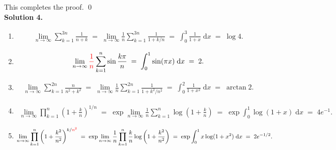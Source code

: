 \documentclass[10pt]{article}
\begin{document}
        This completes the proof. \qed\\

        \textbf{Solution 4.}
        \begin{enumerate}
                \item
                        \begin{align*}
                                \lim_{n \to \infty} \sum_{k = 1}^{3n} \frac{1}{n + k}
                                \;=\; \lim_{n \to \infty} \frac{1}{n}\sum_{k = 1}^{3n} \frac{1}{1 + k /n}
                                \;=\; \int_0^3 \frac{1}{1 + x} \;\mathrm{d}{x}
                                \;=\; \log{4}.
                        \end{align*}
                \item 
                        \begin{align*}
                                \lim_{n \to \infty} \textcolor{red}{\frac{1}{n}}\sum_{k = 1}^{n} \sin{\frac{k\pi}{n}}
                                \;=\; \int_0^1 \sin(\pi x) \;\mathrm{d}{x}
                                \;=\; 2.
                        \end{align*}
                \item 
                        \begin{align*}
                                \lim_{n \to \infty} \sum_{k = 1}^{2n} \frac{n}{n^2 + k^2}
                                \;=\; \lim_{n \to \infty} \frac{1}{n}\sum_{k = 1}^{2n} \frac{1}{1 + k^2 /n^2}
                                \;=\; \int_0^2 \frac{1}{1 + x^2} \;\mathrm{d}{x}
                                \;=\; \arctan{2}.
                        \end{align*}
                \item 
                        \begin{align*}
                                \lim_{n \to \infty} \prod_{k = 1}^{n} \left(1 + \frac{k}{n}\right)^{1 /n}
                                \;=\; \exp \lim_{n \to \infty} \frac{1}{n}\sum_{k = 1}^{n} \log\left(1 + \frac{k}{n} \right)
                                \;=\; \exp \int_0^1 \log(1 + x) \;\mathrm{d}{x}
                                \;=\; 4 e^{-1}.
                        \end{align*}
                \item 
                        \begin{align*}
                                \lim_{n \to \infty} \prod_{k = 1}^n \left(1 + \frac{k^2}{n^2}\right)^{k /\color{red}{n^2}}
                                \;=\; \exp \lim_{n \to \infty} \frac{1}{n} \prod_{k = 1}^n \frac{k}{n} \log\left(1 + \frac{k^2}{n^2}\right)
                                \;=\; \exp \int_0^1 x \log(1 + x^2) \;\mathrm{d}x
                                \;=\; 2e^{-1 /2}.
                        \end{align*}
        \end{enumerate}
        
\end{document}

